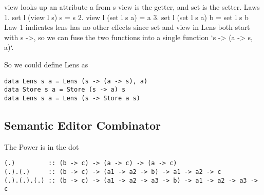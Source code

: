 view looks up an attribute a from s
view is the getter, and set is the setter.
Laws
1. set l (view l s) s = s
2. view l (set l s a) = a
3. set l (set l s a) b = set l s b
Law 1 indicates lens has no other effects
since set and view in Lens both start with s ->, so we can fuse the two functions into a single function
`s -> (a -> s, a)`.

So we could define Lens as
\begin{verbatim}
data Lens s a = Lens (s -> (a -> s), a)
data Store s a = Store (s -> a) s
data Lens s a = Lens (s -> Store a s)
\end{verbatim}


\subsection{Semantic Editor Combinator}

The Power is in the dot
\vspace{1mm}
\begin{verbatim}
(.)         :: (b -> c) -> (a -> c) -> (a -> c)
(.).(.)     :: (b -> c) -> (a1 -> a2 -> b) -> a1 -> a2 -> c
(.).(.).(.) :: (b -> c) -> (a1 -> a2 -> a3 -> b) -> a1 -> a2 -> a3 -> c
\end{verbatim}
\vspace{1mm}


